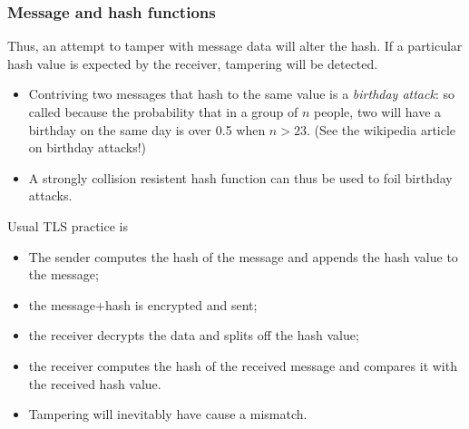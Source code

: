 \documentclass[10pt, hyperref={pdfpagelabels=false}]{beamer}
\begin{document}
\begin{frame}
\frametitle{Message and hash functions}

Thus, an attempt to tamper with message data will alter the hash. If a particular hash value is expected by the receiver, tampering will be detected.
\begin{itemize}
\item Contriving two messages that hash to the same value is a \emph{birthday attack}: so called because the probability that in a group of $n$ people, two will have a birthday on the same day is over 0.5 when $n > 23$. (See the wikipedia article on birthday attacks!) 
\item A strongly collision resistent hash function can thus be used to foil birthday attacks.
\end{itemize} 

Usual TLS practice is
\begin{itemize}
\item The sender computes the hash of the message and appends the hash value to the message;
\item the message+hash is encrypted and sent;
\item the receiver decrypts the data and splits off the hash value;
\item the receiver computes the hash of the received message and compares it with the received hash value.
\item Tampering will inevitably have cause a mismatch.
\end{itemize} 
\end{frame}
\end{document}
